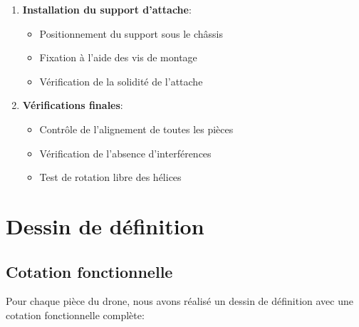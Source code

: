 \documentclass[a4paper,12pt]{report}
\begin{document}
\begin{enumerate}
    \item \textbf{Installation du support d'attache}:
    \begin{itemize}
        \item Positionnement du support sous le châssis
        \item Fixation à l'aide des vis de montage
        \item Vérification de la solidité de l'attache
    \end{itemize}
    
    \item \textbf{Vérifications finales}:
    \begin{itemize}
        \item Contrôle de l'alignement de toutes les pièces
        \item Vérification de l'absence d'interférences
        \item Test de rotation libre des hélices
    \end{itemize}
\end{enumerate}

\chapter{Dessin de définition}
\section{Cotation fonctionnelle}
Pour chaque pièce du drone, nous avons réalisé un dessin de définition avec une cotation fonctionnelle complète:
\end{document}
